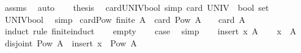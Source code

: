 \begin{isabellebody}
\ assms\ \isamarkupfalse%
\ auto\isanewline
\ \ \isamarkupfalse%
\ {\isacharquery}{\kern0pt}thesis\ \isacommand{{\isachardot}{\kern0pt}{\isachardot}{\kern0pt}}\isamarkupfalse%
\isanewline
{}\isamarkupfalse%
%
\endisatagproof
{\isafoldproof}%
%
\isadelimproof
%
\endisadelimproof
%
\isadelimdocument
%
\endisadelimdocument
%
\isatagdocument
%
\isamarkuptrue%
%
\endisatagdocument
{\isafolddocument}%
%
\isadelimdocument
%
\endisadelimdocument
{}\isamarkupfalse%
\ card{\isacharunderscore}{\kern0pt}UNIV{\isacharunderscore}{\kern0pt}bool\ {\isacharbrackleft}{\kern0pt}simp{\isacharbrackright}{\kern0pt}{\isacharcolon}{\kern0pt}\ {\isachardoublequoteopen}card\ {\isacharparenleft}{\kern0pt}UNIV\ {\isacharcolon}{\kern0pt}{\isacharcolon}{\kern0pt}\ bool\ set{\isacharparenright}{\kern0pt}\ {\isacharequal}{\kern0pt}\ {}{\isachardoublequoteclose}\isanewline
%
\isadelimproof
\ \ %
\endisadelimproof
%
\isatagproof
{}\isamarkupfalse%
\ UNIV{\isacharunderscore}{\kern0pt}bool\ \isamarkupfalse%
\ simp%
\endisatagproof
{\isafoldproof}%
%
\isadelimproof
\isanewline
%
\endisadelimproof
\isanewline
{}\isamarkupfalse%
\ card{\isacharunderscore}{\kern0pt}Pow{\isacharcolon}{\kern0pt}\ {\isachardoublequoteopen}finite\ A\ {\isasymLongrightarrow}\ card\ {\isacharparenleft}{\kern0pt}Pow\ A{\isacharparenright}{\kern0pt}\ {\isacharequal}{\kern0pt}\ {}\ {\isacharcircum}{\kern0pt}\ card\ A{\isachardoublequoteclose}\isanewline
%
\isadelimproof
%
\endisadelimproof
%
\isatagproof
{}\isamarkupfalse%
\ {\isacharparenleft}{\kern0pt}induct\ rule{\isacharcolon}{\kern0pt}\ finite{\isacharunderscore}{\kern0pt}induct{\isacharparenright}{\kern0pt}\isanewline
\ \ \isamarkupfalse%
\ empty\isanewline
\ \ \isamarkupfalse%
\ {\isacharquery}{\kern0pt}case\ \isamarkupfalse%
\ simp\isanewline
{}\isamarkupfalse%
\isanewline
\ \ \isamarkupfalse%
\ {\isacharparenleft}{\kern0pt}insert\ x\ A{\isacharparenright}{\kern0pt}\isanewline
\ \ \isamarkupfalse%
\ {\isacartoucheopen}x\ {\isasymnotin}\ A{\isacartoucheclose}\ \isamarkupfalse%
\ disjoint{\isacharcolon}{\kern0pt}\ {\isachardoublequoteopen}Pow\ A\ {\isasyminter}\ insert\ x\ {\isacharbackquote}{\kern0pt}\ Pow\ A\ {\isacharequal}{\kern0pt}\ {\isacharbraceleft}{\kern0pt}{\isacharbraceright}{\kern0pt}{\isachardoublequoteclose}\ \isamarkupfalse%

\end{isabellebody}
